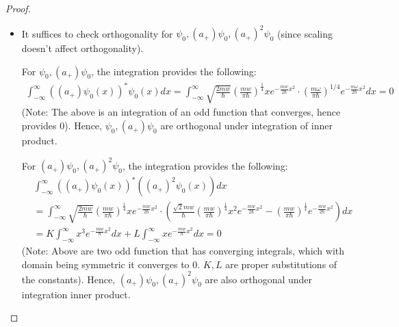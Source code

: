 \documentclass{article}
\begin{document}
\begin{proof}
\begin{itemize}
        \hfill

        \item[(b)] It suffices to check orthogonality for $\psi_0, (a_+)\psi_0, (a_+)^2\psi_0$ (since scaling doesn't affect orthogonality). 

        For $\psi_0, (a_+)\psi_0$, the integration provides the following:
        \begin{align}
            \int_{-\infty}^{\infty}((a_+)\psi_0(x))^* \psi_0(x)dx= \int_{-\infty}^{\infty}\sqrt{\frac{2mw}{\hbar}}\left(\frac{mw}{\pi\hbar}\right)^\frac{1}{4}xe^{-\frac{mw}{2\hbar}x^2}\cdot \left(\frac{m\omega}{\pi \hbar}\right)^{1/4} e^{- \frac{m\omega}{2\hbar}x^2}dx=0
        \end{align}
        (Note: The above is an integration of an odd function that converges, hence provides $0$). Hence, $\psi_0, (a_+)\psi_0$ are orthogonal under integration of inner product.

        For $(a_+)\psi_0, (a_+)^2\psi_0$, the integration provides the following:
        \begin{align}
            &\int_{-\infty}^{\infty}((a_+)\psi_0(x))^* ((a_+)^2\psi_0(x))dx\\
            &= \int_{-\infty}^{\infty}\sqrt{\frac{2mw}{\hbar}}\left(\frac{mw}{\pi\hbar}\right)^\frac{1}{4}xe^{-\frac{mw}{2\hbar}x^2}\cdot \left(\frac{\sqrt{2}mw}{\hbar}\left(\frac{mw}{\pi\hbar}\right)^\frac{1}{4}x^2e^{-\frac{mw}{2\hbar}x^2} - \left(\frac{mw}{\pi\hbar}\right)^\frac{1}{4}e^{-\frac{mw}{2\hbar}x^2}\right)dx\\
            &= K\int_{-\infty}^{\infty}x^3e^{-\frac{mw}{\hbar}x^2}dx + L\int_{-\infty}^{\infty}xe^{-\frac{mw}{\hbar}x^2}dx = 0
        \end{align}
        (Note: Above are two odd function that has converging integrals, which with domain being symmetric it converges to $0$. $K,L$ are proper substitutions of the constants).
        Hence, $(a_+)\psi_0, (a_+)^2 \psi_0$ are also orthogonal under integration inner product.


\end{itemize}
\end{proof}
\end{document}
